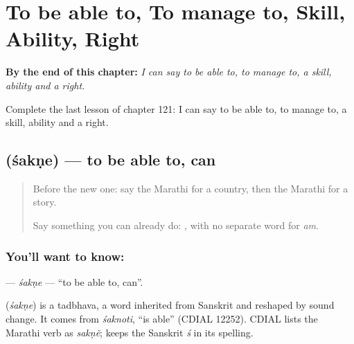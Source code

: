
\chapter{To be able to, To manage to, Skill, Ability, Right}
\label{ch:mr-to-be-able-to-to-manage-to-skill-ability-right}

\begin{chapteropening}
\textbf{By the end of this chapter:} \emph{I can say to be able to, to manage to, a skill, ability and a right.}

Complete the last lesson of chapter 121: I can say to be able to, to manage to, a skill, ability and a right.
\end{chapteropening}

\section[\texorpdfstring{\mr{शकणे} (śakṇe)}{शकणे (śakṇe)}]{ (śakṇe) — to be able to, can}

\label{lesson:MR-C121-sakne}



\begin{quote}
Before the new one: say the Marathi for a country, then the Marathi for a story.

Say something you can already do: \textbf{  }, with no separate word for \emph{am}.
\end{quote}

\subsection*{You'll want to know: }
\textbf{} — \emph{śakṇe} — \textquotedblleft{}to be able to, can\textquotedblright{}.

\begin{cousinweb}
\textbf{} (\emph{śakṇe}) is a tadbhava, a word inherited from Sanskrit and reshaped by sound change. It comes from \emph{śaknoti}, \textquotedblleft{}is able\textquotedblright{} (CDIAL 12252). CDIAL lists the Marathi verb as \emph{sakṇẽ}; \textbf{} keeps the Sanskrit \emph{ś} in its spelling.
\end{cousinweb}

